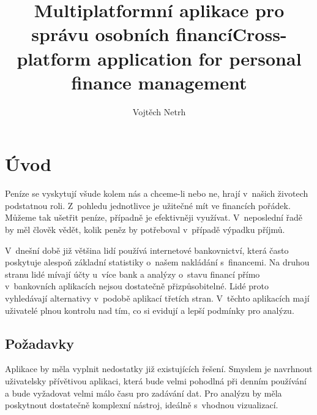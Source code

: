 \documentclass[
  biblatex,
  figures=true,
  tables=false,
  glossaries,
  index
]{kidiplom}
\title{Multiplatformní aplikace pro správu osobních financí}
\title[english]{Cross-platform application for personal finance management}
\author{Vojtěch Netrh}
\begin{document}
\maketitle



\newcommand{\BibLaTeX}{\textsc{Bib}\LaTeX}

\section{Úvod}
Peníze se vyskytují všude kolem nás a chceme-li nebo ne, hrají v~našich životech podstatnou roli. Z~pohledu jednotlivce je užitečné mít ve financích pořádek. Můžeme tak ušetřit peníze, případně je efektivněji využívat. V~neposlední řadě by měl člověk vědět, kolik peněz by potřeboval v~případě výpadku příjmů.

V~dnešní době již většina lidí používá internetové bankovnictví, která často poskytuje alespoň základní statistiky o~našem nakládání s~financemi. Na druhou stranu lidé mívají účty u~více bank a analýzy o~stavu financí přímo v~bankovních aplikacích nejsou dostatečně přizpůsobitelné. Lidé proto vyhledávají alternativy v~podobě aplikací třetích stran. V~těchto aplikacích mají uživatelé plnou kontrolu nad tím, co si evidují a lepší podmínky pro analýzu.

\subsection{Požadavky}
Aplikace by měla vyplnit nedostatky již existujících řešení. Smyslem je navrhnout uživatelsky přívětivou aplikaci, která bude velmi pohodlná při denním používání a bude vyžadovat velmi málo času pro zadávání dat. Pro analýzu by měla poskytnout dostatečně komplexní nástroj, ideálně s~vhodnou vizualizací.
\end{document}
